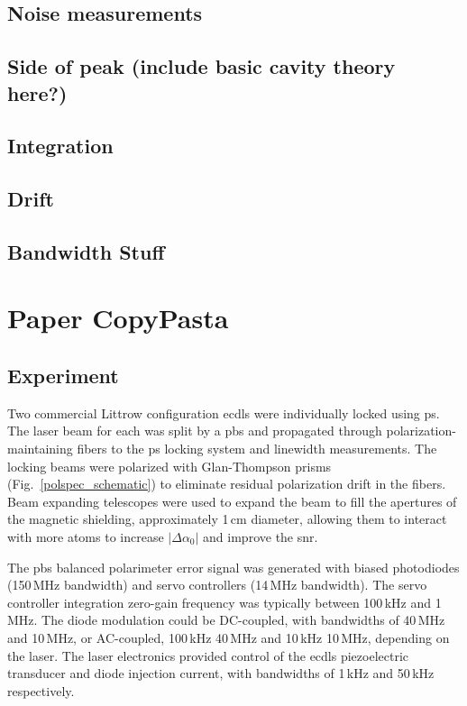 \subsection{Noise measurements}
\subsection{Side of peak (include basic cavity theory here?)}
\subsection{Integration}
\subsection{Drift}
\subsection{Bandwidth Stuff}

\section{Paper CopyPasta}

\subsection{Experiment}

Two commercial Littrow configuration \glspl*{ecdl} \cite{equipment} were individually locked using \gls*{ps}. The laser beam for each was split by a \gls*{pbs} and propagated through polarization-maintaining fibers to the \gls*{ps} locking system and linewidth measurements.  The locking beams were polarized with Glan-Thompson prisms (Fig.~\ref{polspec_schematic}) to eliminate residual polarization drift in the fibers. Beam expanding telescopes were used to expand the beam to fill the apertures of the magnetic shielding, approximately 1\,cm diameter, allowing them to interact with more atoms to increase $|\Delta\alpha_0|$ and improve the \gls*{snr}.

The \gls*{pbs} balanced polarimeter error signal was generated with biased photodiodes (150\,MHz bandwidth) and servo controllers (14\,MHz bandwidth).  The servo controller integration zero-gain frequency was typically between 100\,kHz and 1\,MHz. The diode modulation could be DC-coupled, with bandwidths of 40\,MHz and 10\,MHz, or AC-coupled, 100\,kHz\,\textendash\,40\,MHz and 10\,kHz\,\textendash\,10\,MHz, depending on the laser.  The laser electronics provided control of the \glspl*{ecdl} piezoelectric transducer and diode injection current, with bandwidths of 1\,kHz and 50\,kHz respectively.

